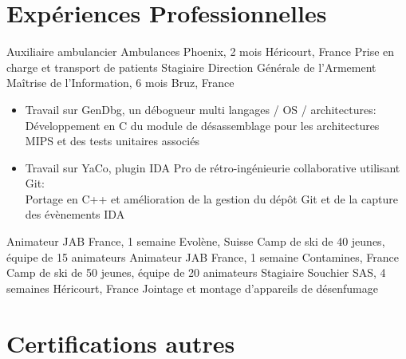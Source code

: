 \documentclass[letterpaper,10pt,sans]{moderncv}
\begin{document}

	\vspace*{\deletedSpace}
	\section{Expériences Professionnelles}
			{Auxiliaire ambulancier}
			{Ambulances Phoenix, 2 mois}
			{Héricourt, France}
			{Prise en charge et transport de patients}
			{}
			{Stagiaire}
			{Direction Générale de l'Armement Maîtrise de l'Information, 6 mois}
			{Bruz, France}
			{}
			{}
			\vspace{-5pt}
			\begin{itemize}
				\item Travail sur GenDbg, un débogueur multi langages / OS / architectures:\\
					\phantom{=}Développement en C du module de désassemblage pour les architectures MIPS et des tests unitaires associés
				\item Travail sur YaCo, plugin IDA Pro de rétro-ingénieurie collaborative utilisant Git:\\
					\phantom{=}Portage en C++ et amélioration de la gestion du dépôt Git et de la capture des évènements IDA
			\end{itemize}
			\vspace{5pt}
			{Animateur}
			{JAB France, 1 semaine}
			{Evolène, Suisse}
			{Camp de ski de 40 jeunes, équipe de 15 animateurs}
			{}
			{Animateur}
			{JAB France, 1 semaine}
			{Contamines, France}
			{Camp de ski de 50 jeunes, équipe de 20 animateurs}
			{}
			{Stagiaire}
			{Souchier SAS, 4 semaines}
			{Héricourt, France}
			{Jointage et montage d'appareils de désenfumage}
			{}

	\newpage


	\section{Certifications autres}
\end{document}
